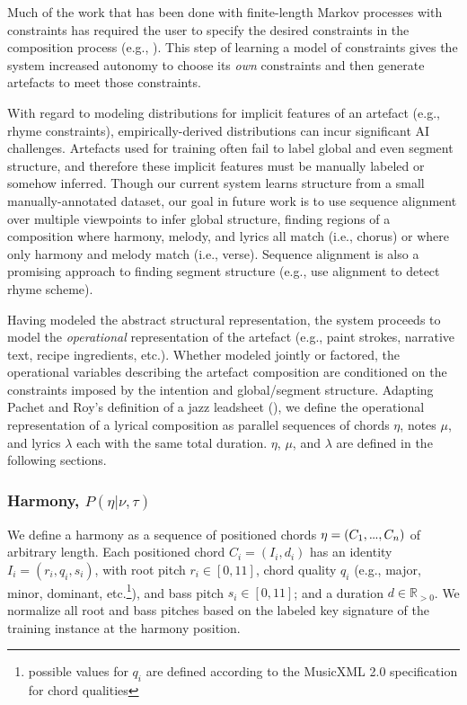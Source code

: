 \documentclass[phd,electronic,oneside,twosidetoc,letterpaper,chaptercenter,parttop,lol,lof,lot]{byumsphd}
\newcommand\mydots{\hbox to .75em{.\hss.\hss.}}
\begin{document}
Much of the work that has been done with finite-length Markov processes with constraints has required the user to specify the desired constraints in the composition process (e.g., \cite{pachet2014imitative,barbieri2012markov}). This step of learning a model of constraints gives the system increased autonomy to choose its \emph{own} constraints and then generate artefacts to meet those constraints.

With regard to modeling distributions for implicit features of an artefact (e.g., rhyme constraints), empirically-derived distributions can incur significant AI challenges. Artefacts used for training often fail to label global and even segment structure, and therefore these implicit features must be manually labeled or somehow inferred. Though our current system learns structure from a small manually-annotated dataset, our goal in future work is to use sequence alignment over multiple viewpoints to infer global structure, finding regions of a composition where harmony, melody, and lyrics all match (i.e., chorus) or where only harmony and melody match (i.e., verse). Sequence alignment is also a promising approach to finding segment structure (e.g., \citeauthor{hirjee2010using} \cite{hirjee2010using} use alignment to detect rhyme scheme).

Having modeled the abstract structural representation, the system proceeds to model the \emph{operational} representation of the artefact (e.g., paint strokes, narrative text, recipe ingredients, etc.). Whether modeled jointly or factored, the operational variables describing the artefact composition are conditioned on the constraints imposed by the intention and global/segment structure. Adapting Pachet and Roy's definition of a jazz leadsheet (\citeyear{pachet2014imitative}), we define the operational representation of a lyrical composition as parallel sequences of chords $\eta$, notes $\mu$, and lyrics $\lambda$ each with the same total duration. $\eta$, $\mu$, and $\lambda$ are defined in the following sections.

\subsubsection{Harmony, $P(\eta|\nu,\tau)$}

We define a harmony as a sequence of positioned chords $\eta = (C_1,\mydots,C_n)$ of arbitrary length. Each positioned chord $C_i = (I_i,d_i)$ has an identity $I_i = (r_i,q_i,s_i)$, with root pitch $r_i\in[0,11]$, chord quality $q_i$ (e.g., major, minor, dominant, etc.\footnote{possible values for $q_i$ are defined according to the MusicXML 2.0 specification for chord qualities}), and bass pitch $s_i\in[0,11]$; and a duration $d \in \mathbb{R}_{>0}$. We normalize all root and bass pitches based on the labeled key signature of the training instance at the harmony position.
\end{document}
